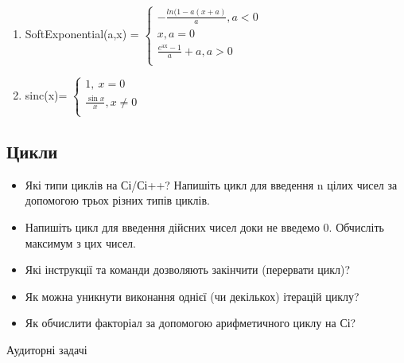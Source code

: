 \documentclass[]{article}
\makeatletter
\newcommand{\xslalph}[1]{\expandafter\@xslalph\csname c@#1\endcsname}
\newcommand{\@xslalph}[1]{%
    \ifcase#1\or а\or б\or в\or г\or д\or e\or є\or ж\or з\or i%
    \or й\or к\or л\or м\or н\or о\or п\or р\or с\or т%
    \or у\or ф\or х\or ц\or ч\or ш\or ю\or я\or аа\or бб\or вв%
    \else\@ctrerr\fi%
}
\makeatother
\begin{document}
\begin{enumerate}
\begin{enumerate}[label=\xslalph*)]
\item 
SoftExponential(a,x) = \(\left\{ \begin{matrix}
 - \frac{ln(1 - a(x + a)}{a},a < 0 \\
x,a = 0 \\
\frac{e^{\text{ax}} - 1}{a} + a,a > 0 \\
\end{matrix} \right.\ \)

\item 
sinc(x)= \(\left\{ \begin{matrix}
1,\ x = 0 \\
\frac{\sin x}{x},x \neq 0 \\
\end{matrix} \right.\ \)

 \end{enumerate}
\end{enumerate}

\newpage
\subsection{ Цикли }
\setcounter{subsection}{1}

\begin{itemize}
\item
  Які типи циклів на Сі/Сі++? Напишіть цикл для введення n цілих чисел
  за допомогою трьох різних типів циклів.
\item
  Напишіть цикл для введення дійсних чисел доки не введемо 0. Обчисліть
  максимум з цих чисел.
\item
  Які інструкції та команди дозволяють закінчити (перервати цикл)?
\item
  Як можна уникнути виконання однієї (чи декількох) ітерацій циклу?
\item
  Як обчислити факторіал за допомогою арифметичного циклу на Сі?
\end{itemize}

Аудиторні задачі
\end{document}
